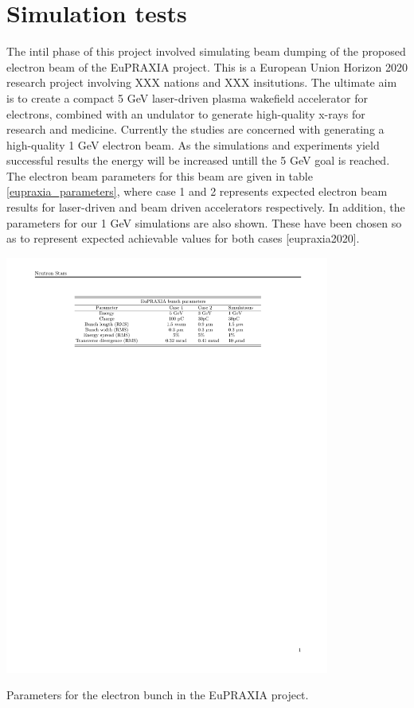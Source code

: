 \chapter{Simulation tests} %
The intil phase of this project involved simulating beam dumping of the proposed electron beam of the EuPRAXIA project. This is a European Union Horizon 2020 research project involving XXX nations and XXX insitutions. The ultimate aim is to create a compact 5 GeV laser-driven plasma wakefield accelerator for electrons, combined with an undulator to generate high-quality x-rays for research and medicine. Currently the studies are concerned with generating a high-quality 1 GeV electron beam. As the simulations and experiments yield successful results the energy will be increased untill the 5 GeV goal is reached. The electron beam parameters for this beam are given in table \ref{eupraxia_parameters}, where case 1 and 2 represents expected electron beam results for laser-driven and beam driven accelerators respectively.  In addition, the parameters for our 1 GeV simulations are also shown. These have been chosen so as to represent expected achievable values for both cases [eupraxia2020]. 
\begin{table}[ht!]
\centering
\includegraphics[width=0.8\textwidth]{table.pdf}
\caption{Parameters for the electron bunch in the EuPRAXIA project.}
\label{eupraxia_parameters}
\end{table}
